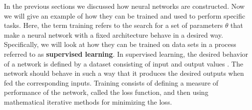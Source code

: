 In the previous sections we discussed how neural networks are constructed. Now we will give an example of how they can be trained and used to perform specific tasks. Here, the term training refers to the search for a set of parameters $\theta$ that make a neural network with a fixed architecture behave in a desired way. Specifically, we will look at how they can be trained on data sets in a process referred to as \textbf{supervised learning}. In supervised learning, the desired behavior of a network is defined by a dataset consisting of input and output values \cite{SupervisedLearningOverview}. The network should behave in such a way that it produces the desired outputs when fed the corresponding inputs. Training consists of defining a measure of performance of the network, called the loss function, and then using mathematical iterative methods for minimizing the loss.

